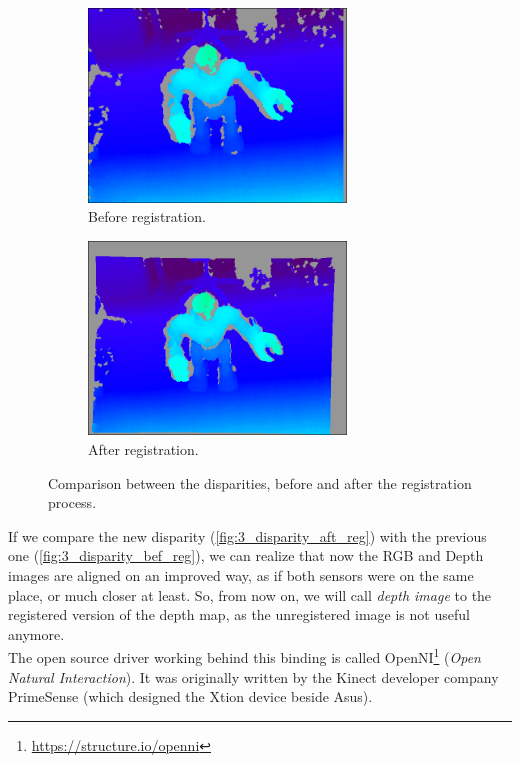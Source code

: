 		\begin{figure}[h]
			\begin{subfigure}[h]{0.4\linewidth}
				\centering
				\includegraphics[width=2.7in]{images/disparity_before}
				\caption{Before registration.}
				\label{fig:3_disparity_bef_reg}
			\end{subfigure}
			\hfill
			\begin{subfigure}[h!]{0.4\linewidth}
				\centering
				\includegraphics[width=2.7in]{images/disparity_after}
				\caption{After registration.}
				\label{fig:3_disparity_aft_reg}
			\end{subfigure}
			\caption{Comparison between the disparities, before and after the registration process.}
			\label{fig:3_disparities_comp}
		\end{figure}
		
		If we compare the new disparity (\autoref{fig:3_disparity_aft_reg}) with the previous one (\autoref{fig:3_disparity_bef_reg}), we can realize that now the RGB and Depth images are aligned on an improved way, as if both sensors were on the same place, or much closer at least. So, from now on, we will call \emph{depth image} to the registered version of the depth map, as the unregistered image is not useful anymore.\\
		
		The open source driver working behind this binding is called OpenNI\footnote{\url{https://structure.io/openni}} (\emph{Open Natural Interaction}). It was originally written by the Kinect developer company PrimeSense (which designed the Xtion device beside Asus).\\
		
